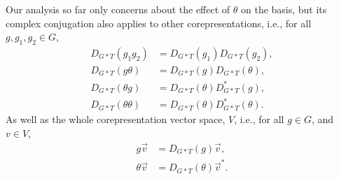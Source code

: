 \documentclass[preprint, 12pt]{revtex4-2}
\numberwithin{equation}{section}
\begin{document}
Our analysis so far only concerns about the effect of $\theta$ on the basis, but its complex conjugation also applies to other corepresentations, i.e., for all $g, g_1, g_2\in G$,
\begin{equation}\label{eq:G*T composition}
    \begin{aligned}
        D_{G\ast T}(g_1g_2) &= D_{G\ast T}(g_1)D_{G\ast T}(g_2), \\
        D_{G\ast T}(g\theta) &= D_{G\ast T}(g)D_{G\ast T}(\theta), \\
        D_{G\ast T}(\theta g) &= D_{G\ast T}(\theta)D_{G\ast T}^\ast(g), \\
        D_{G\ast T}(\theta\theta) &= D_{G\ast T}(\theta)D_{G\ast T}^\ast(\theta).
    \end{aligned}
\end{equation}
As well as the whole corepresentation vector space, $V$, i.e., for all $g\in G$, and $v\in V$,
\begin{equation}\label{eq:G*T vector space}
    \begin{aligned}
        g\vec{v} &= D_{G\ast T}(g)\vec{v}, \\
        \theta\vec{v} &= D_{G\ast T}(\theta)\vec{v}^\ast.
    \end{aligned}
\end{equation}
\end{document}
